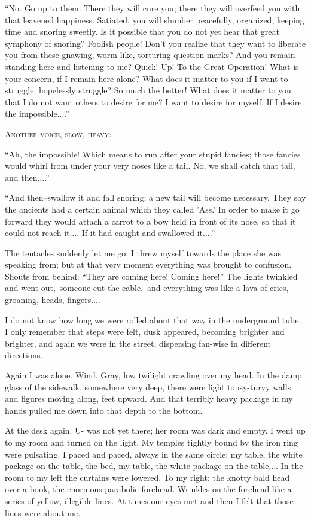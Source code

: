 \documentclass[11pt,openany]{book}
\begin{document}
``No. Go up to them. There they will cure you; there they will overfeed you with that leavened happiness. Satiated, you will slumber peacefully, organized, keeping time and snoring sweetly. Is it possible that you do not yet hear that great symphony of snoring? Foolish people! Don't you realize that they want to liberate you from these gnawing, worm-like, torturing question marks? And you remain standing here and listening to me? Quick! Up! To the Great Operation! What is your concern, if I remain here alone? What does it matter to you if I want to struggle, hopelessly struggle? So much the better! What does it matter to you that I do not want others to desire for me? I want to desire for myself. If I desire the impossible....''

\begin{center}\textsc{Another voice, slow, heavy:}\end{center}

``Ah, the impossible! Which means to run after your stupid fancies; those fancies would whirl from under your very noses like a tail. No, we shall catch that tail, and then....''

``And then--swallow it and fall snoring; a new tail will become necessary. They say the ancients had a certain animal which they called 'Ass.' In order to make it go forward they would attach a carrot to a bow held in front of its nose, so that it could not reach it.... If it had caught and swallowed it....''

The tentacles suddenly let me go; I threw myself towards the place she was speaking from; but at that very moment everything was brought to confusion. Shouts from behind: ``They are coming here! Coming here!'' The lights twinkled and went out,--someone cut the cable,--and everything was like a lava of cries, groaning, heads, fingers....

I do not know how long we were rolled about that way in the underground tube. I only remember that steps were felt, dusk appeared, becoming brighter and brighter, and again we were in the street, dispersing fan-wise in different directions.

Again I was alone. Wind. Gray, low twilight crawling over my head. In the damp glass of the sidewalk, somewhere very deep, there were light topsy-turvy walls and figures moving along, feet upward. And that terribly heavy package in my hands pulled me down into that depth to the bottom.

At the desk again. U- was not yet there; her room was dark and empty. I went up to my room and turned on the light. My temples tightly bound by the iron ring were pulsating. I paced and paced, always in the same circle: my table, the white package on the table, the bed, my table, the white package on the table.... In the room to my left the curtains were lowered. To my right: the knotty bald head over a book, the enormous parabolic forehead. Wrinkles on the forehead like a series of yellow, illegible lines. At times our eyes met and then I felt that those lines were about me.
\end{document}
